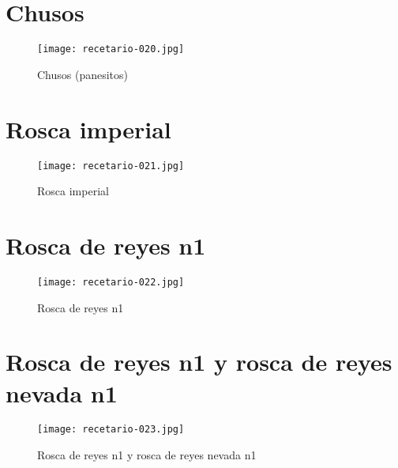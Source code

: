 \documentclass[12pt,letterpaper]{article}
\begin{document}
\newpage

  \section{Chusos}
  
    \begin{figure}[H]
      \vspace{2pt}
    \texttt{[image: recetario-020.jpg]}
      \caption{Chusos (panesitos) }
      
    \end{figure}

\newpage

  \section{Rosca imperial}
  
    \begin{figure}[H]
      \vspace{2pt}
    \texttt{[image: recetario-021.jpg]}
      \caption{Rosca imperial}
      
    \end{figure}

\newpage

  \section{Rosca de reyes n1}
  
    \begin{figure}[H]
      \vspace{2pt}
    \texttt{[image: recetario-022.jpg]}
      \caption{Rosca de reyes n1}
      
    \end{figure}

\newpage

  \section{Rosca de reyes n1  y rosca de reyes nevada n1}

    \begin{figure}[H]
      \vspace{2pt}
    \texttt{[image: recetario-023.jpg]}
      \caption{Rosca de reyes n1  y rosca de reyes nevada n1}
      
    \end{figure}
\end{document}
